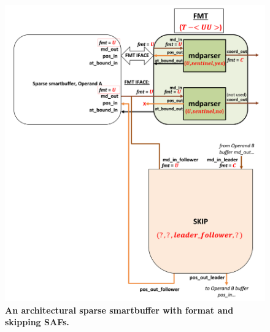 \begin{figure}[ht]
\includegraphics[width=\textwidth]{figures/safinference_build_08skipportfmt.png}
\caption{\textbf{An architectural sparse smartbuffer with format and skipping SAFs.}}
\label{fig:safinference_build_08skipportfmt}
\centering
\end{figure}



